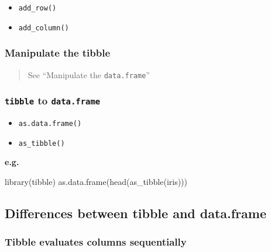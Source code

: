 \documentclass[
]{article}
\newenvironment{Shaded}{}{}
\newcommand{\FunctionTok}[1]{\textcolor[rgb]{0.02,0.16,0.49}{#1}}
\newcommand{\NormalTok}[1]{#1}
\begin{document}
\begin{itemize}
\item
  \texttt{add\_row()}
\item
  \texttt{add\_column()}
\end{itemize}

\hypertarget{manipulate-the-tibble}{%
\subsubsection{Manipulate the tibble}\label{manipulate-the-tibble}}

\begin{quote}
See ``Manipulate the \texttt{data.frame}''
\end{quote}

\hypertarget{tibble-to-dataframe}{%
\subsubsection{\texorpdfstring{\texttt{tibble} to
\texttt{data.frame}}{tibble to data.frame}}\label{tibble-to-dataframe}}

\begin{itemize}
\item
  \texttt{as.data.frame()}
\item
  \texttt{as\_tibble()}
\end{itemize}

\textbf{e.g.}

\begin{Shaded}
\begin{Highlighting}[]
\FunctionTok{library}\NormalTok{(tibble)}
\FunctionTok{as.data.frame}\NormalTok{(}\FunctionTok{head}\NormalTok{(}\FunctionTok{as\_tibble}\NormalTok{(iris)))}
\end{Highlighting}
\end{Shaded}

\hypertarget{differences-between-tibble-and-dataframe}{%
\subsection{Differences between tibble and
data.frame}\label{differences-between-tibble-and-dataframe}}

\hypertarget{tibble-evaluates-columns-sequentially}{%
\subsubsection{Tibble evaluates columns
sequentially}\label{tibble-evaluates-columns-sequentially}}
\end{document}
